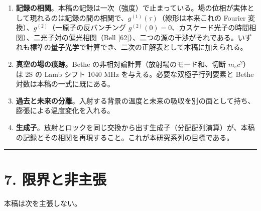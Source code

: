 \documentclass[
  a4paper,
]{ltjsarticle}
\providecommand{\tightlist}{%
  \setlength{\itemsep}{0pt}\setlength{\parskip}{0pt}}
\begin{document}
\begin{enumerate}
\def\labelenumi{\arabic{enumi}.}
\tightlist
\item
  \textbf{記録の相関}。本稿の記録は一次（強度）で止まっている。場の位相が実体として現れるのは記録の間の相関で、\(g^{(1)}(\tau)\)（線形は本来これの
  Fourier 変換）、\(g^{(2)}\)（一原子の反バンチング
  \(g^{(2)}(0)=0\)、カスケード光子の時間相関）、二光子対の偏光相関（Bell
  {[}62{]}）、二つの源の干渉がそれである。いずれも標準の量子光学で計算でき、二次の正解表として本稿に加えられる。
\item
  \textbf{真空の場の痕跡}。Bethe の非相対論計算（放射場のモード和、切断
  \(m_ec^2\)）は 2S の Lamb シフト 1040 MHz
  を与える。必要な双極子行列要素と Bethe 対数は本稿の一式に既にある。
\item
  \textbf{過去と未来の分離}。入射する背景の温度と未来の吸収を別の面として持ち、膨張による温度変化を入れる。
\item
  \textbf{生成子}。放射とロックを同じ交換から出す生成子（分配配列演算）が、本稿の記録とその相関を再現すること。これが本研究系列の目標である。
\end{enumerate}

\begin{center}\rule{0.5\linewidth}{0.5pt}\end{center}

\section{7. 限界と非主張}\label{ux9650ux754cux3068ux975eux4e3bux5f35}

本稿は次を主張しない。
\end{document}
